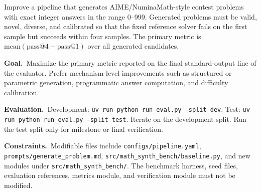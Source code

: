 \documentclass{llmxive}
\begin{document}
\begin{promptbox}[title=\textbf{Math-Reasoning Data Synthesis Task Instruction}]
Improve a pipeline that generates AIME/NuminaMath-style contest problems
with exact integer answers in the range 0--999.
Generated problems must be valid, novel, diverse, and calibrated so that the
fixed reference solver fails on the first sample but succeeds within four
samples.
The primary metric is $\mathrm{mean}(\mathrm{pass@4} - \mathrm{pass@1})$ over all
generated candidates.

\smallskip
\noindent\textbf{Goal.}~Maximize the primary metric reported on the final
standard-output line of the evaluator.
Prefer mechanism-level improvements such as structured or parametric
generation, programmatic answer computation, and difficulty calibration.

\smallskip
\noindent\textbf{Evaluation.}~Development: \texttt{uv run python run\_eval.py --split dev}.
Test: \texttt{uv run python run\_eval.py --split test}.
Iterate on the development split. Run the test split only for milestone or
final verification.

\smallskip
\noindent\textbf{Constraints.}~Modifiable files include
\texttt{configs/pipeline.yaml}, \texttt{prompts/generate\_problem.md},
\texttt{src/math\_synth\_bench/baseline.py}, and new modules under
\texttt{src/math\_synth\_bench/}.
The benchmark harness, seed files, evaluation references, metrics module,
and verification module must not be modified.
\end{promptbox}

\FloatBarrier
\end{document}

